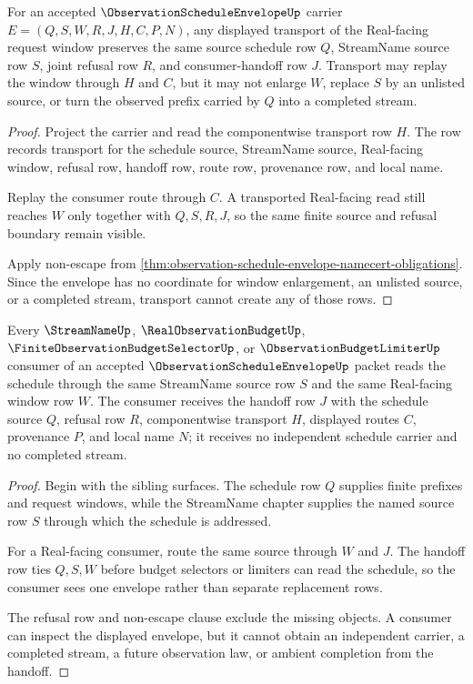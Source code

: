 \begin{theorem}
\label{thm:observation-schedule-envelope-window-transport}
For an accepted $\ObservationScheduleEnvelopeUp$ carrier $E=(Q,S,W,R,J,H,C,P,N)$, any displayed transport of the Real-facing request window preserves the same source schedule row $Q$, StreamName source row $S$, joint refusal row $R$, and consumer-handoff row $J$. Transport may replay the window through $H$ and $C$, but it may not enlarge $W$, replace $S$ by an unlisted source, or turn the observed prefix carried by $Q$ into a completed stream.
\end{theorem}
\begin{proof}
Project the carrier and read the componentwise transport row $H$. The row records transport for the schedule source, StreamName source, Real-facing window, refusal row, handoff row, route row, provenance row, and local name.

Replay the consumer route through $C$. A transported Real-facing read still reaches $W$ only together with $Q,S,R,J$, so the same finite source and refusal boundary remain visible.

Apply non-escape from \autoref{thm:observation-schedule-envelope-namecert-obligations}. Since the envelope has no coordinate for window enlargement, an unlisted source, or a completed stream, transport cannot create any of those rows.
\end{proof}

\begin{theorem}
\label{thm:observation-schedule-envelope-streamname-handoff}
Every $\StreamNameUp$, $\RealObservationBudgetUp$, $\FiniteObservationBudgetSelectorUp$, or $\ObservationBudgetLimiterUp$ consumer of an accepted $\ObservationScheduleEnvelopeUp$ packet reads the schedule through the same StreamName source row $S$ and the same Real-facing window row $W$. The consumer receives the handoff row $J$ with the schedule source $Q$, refusal row $R$, componentwise transport $H$, displayed routes $C$, provenance $P$, and local name $N$; it receives no independent schedule carrier and no completed stream.
\end{theorem}
\begin{proof}
Begin with the sibling surfaces. The schedule row $Q$ supplies finite prefixes and request windows, while the StreamName chapter supplies the named source row $S$ through which the schedule is addressed.

For a Real-facing consumer, route the same source through $W$ and $J$. The handoff row ties $Q,S,W$ before budget selectors or limiters can read the schedule, so the consumer sees one envelope rather than separate replacement rows.

The refusal row and non-escape clause exclude the missing objects. A consumer can inspect the displayed envelope, but it cannot obtain an independent carrier, a completed stream, a future observation law, or ambient completion from the handoff.
\end{proof}

